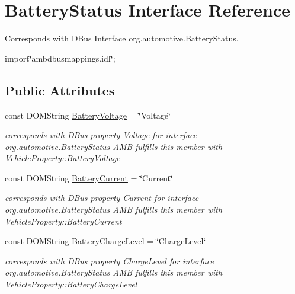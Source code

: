 \hypertarget{interfaceBatteryStatus}{\section{Battery\+Status Interface Reference}
\label{interfaceBatteryStatus}
}


Corresponds with D\+Bus Interface org.\+automotive.\+Battery\+Status.  




{\ttfamily import\char`\"{}ambdbusmappings.\+idl\char`\"{};}

\subsection*{Public Attributes}
\begin{DoxyCompactItemize}
\item 
\hypertarget{interfaceBatteryStatus_afb14133e6ba7b0e975c9d8202240eafd}{const D\+O\+M\+String \hyperlink{interfaceBatteryStatus_afb14133e6ba7b0e975c9d8202240eafd}{Battery\+Voltage} = \char`\"{}Voltage\char`\"{}}\label{interfaceBatteryStatus_afb14133e6ba7b0e975c9d8202240eafd}

\begin{DoxyCompactList}\small\item\em corresponds with D\+Bus property Voltage for interface org.\+automotive.\+Battery\+Status A\+M\+B fulfills this member with Vehicle\+Property\+::\+Battery\+Voltage \end{DoxyCompactList}\item 
\hypertarget{interfaceBatteryStatus_ac0cd6fdef88ab9c883bd7102d3d56b67}{const D\+O\+M\+String \hyperlink{interfaceBatteryStatus_ac0cd6fdef88ab9c883bd7102d3d56b67}{Battery\+Current} = \char`\"{}Current\char`\"{}}\label{interfaceBatteryStatus_ac0cd6fdef88ab9c883bd7102d3d56b67}

\begin{DoxyCompactList}\small\item\em corresponds with D\+Bus property Current for interface org.\+automotive.\+Battery\+Status A\+M\+B fulfills this member with Vehicle\+Property\+::\+Battery\+Current \end{DoxyCompactList}\item 
\hypertarget{interfaceBatteryStatus_a82efd679635044f40e77f32b682caf9d}{const D\+O\+M\+String \hyperlink{interfaceBatteryStatus_a82efd679635044f40e77f32b682caf9d}{Battery\+Charge\+Level} = \char`\"{}Charge\+Level\char`\"{}}\label{interfaceBatteryStatus_a82efd679635044f40e77f32b682caf9d}

\begin{DoxyCompactList}\small\item\em corresponds with D\+Bus property Charge\+Level for interface org.\+automotive.\+Battery\+Status A\+M\+B fulfills this member with Vehicle\+Property\+::\+Battery\+Charge\+Level \end{DoxyCompactList}\end{DoxyCompactItemize}


